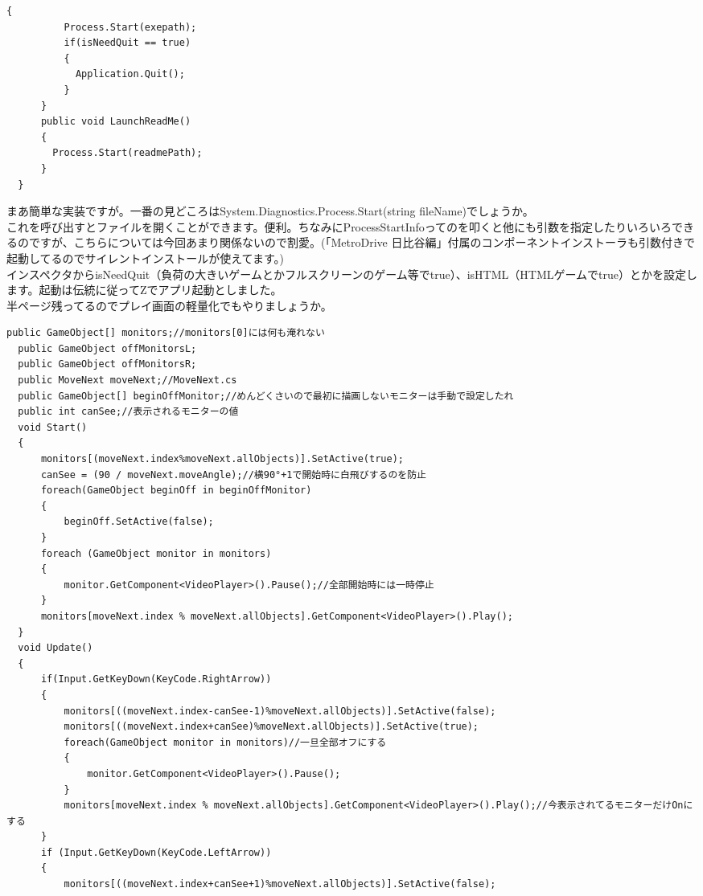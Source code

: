 \documentclass[b5paper,9pt,platex,dvipdfmx]{jsarticle}
\begin{document}
\begin{multicols*}{3}
\begin{lstlisting}[caption=CallApps.cs]
      {
          Process.Start(exepath);
          if(isNeedQuit == true) 
          {
            Application.Quit();
          }
      }
      public void LaunchReadMe()
      {
        Process.Start(readmePath);
      }
  }
\end{lstlisting}
まあ簡単な実装ですが。一番の見どころはSystem.Diagnostics.Process.Start(string fileName)でしょうか。\\
これを呼び出すとファイルを開くことができます。便利。ちなみにProcessStartInfoってのを叩くと他にも引数を指定したりいろいろできるのですが、こちらについては今回あまり関係ないので割愛。(「MetroDrive 日比谷編」付属のコンポーネントインストーラも引数付きで起動してるのでサイレントインストールが使えてます。)\\
インスペクタからisNeedQuit（負荷の大きいゲームとかフルスクリーンのゲーム等でtrue）、isHTML（HTMLゲームでtrue）とかを設定します。起動は伝統に従ってZでアプリ起動としました。\\
半ページ残ってるのでプレイ画面の軽量化でもやりましょうか。\\
\begin{lstlisting}[caption=Monitor.cs]
  public GameObject[] monitors;//monitors[0]には何も淹れない
  public GameObject offMonitorsL;
  public GameObject offMonitorsR;
  public MoveNext moveNext;//MoveNext.cs
  public GameObject[] beginOffMonitor;//めんどくさいので最初に描画しないモニターは手動で設定したれ
  public int canSee;//表示されるモニターの値
  void Start()
  {
      monitors[(moveNext.index%moveNext.allObjects)].SetActive(true);
      canSee = (90 / moveNext.moveAngle);//横90°+1で開始時に白飛びするのを防止
      foreach(GameObject beginOff in beginOffMonitor)
      {
          beginOff.SetActive(false);
      }
      foreach (GameObject monitor in monitors)
      {
          monitor.GetComponent<VideoPlayer>().Pause();//全部開始時には一時停止
      }
      monitors[moveNext.index % moveNext.allObjects].GetComponent<VideoPlayer>().Play();
  }
  void Update()
  {
      if(Input.GetKeyDown(KeyCode.RightArrow))
      {
          monitors[((moveNext.index-canSee-1)%moveNext.allObjects)].SetActive(false);
          monitors[((moveNext.index+canSee)%moveNext.allObjects)].SetActive(true);
          foreach(GameObject monitor in monitors)//一旦全部オフにする
          {
              monitor.GetComponent<VideoPlayer>().Pause();
          }
          monitors[moveNext.index % moveNext.allObjects].GetComponent<VideoPlayer>().Play();//今表示されてるモニターだけOnにする
      }
      if (Input.GetKeyDown(KeyCode.LeftArrow))
      {
          monitors[((moveNext.index+canSee+1)%moveNext.allObjects)].SetActive(false);

\end{lstlisting}
\end{multicols*}
\end{document}
